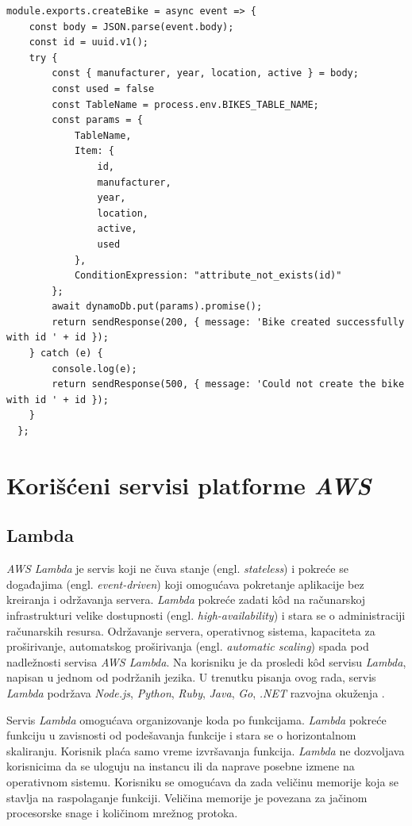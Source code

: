 \documentclass[12pt,oneside]{memoir}
\begin{document}
\begin{lstlisting}[caption={Primer implementacije funkcije za kreiranje bicikala},captionpos=t]
  module.exports.createBike = async event => {
    const body = JSON.parse(event.body);
    const id = uuid.v1();
    try {
        const { manufacturer, year, location, active } = body;
        const used = false
        const TableName = process.env.BIKES_TABLE_NAME;
        const params = {
            TableName,
            Item: {
                id,
                manufacturer,
                year,
                location,
                active,
                used
            },
            ConditionExpression: "attribute_not_exists(id)"
        };
        await dynamoDb.put(params).promise();
        return sendResponse(200, { message: 'Bike created successfully with id ' + id });
    } catch (e) {
        console.log(e);
        return sendResponse(500, { message: 'Could not create the bike with id ' + id });
    }
  };
  \end{lstlisting}
  
\section{Korišćeni servisi platforme \emph{AWS}}
\subsection{Lambda}
   
\emph{AWS Lambda} je servis koji ne čuva stanje (engl. \emph{stateless}) i pokreće se događajima (engl. \emph{event-driven}) koji omogućava pokretanje aplikacije bez kreiranja i održavanja servera. \emph{Lambda} pokreće zadati kôd na računarskoj infrastrukturi velike dostupnosti (engl. \emph{high-availability}) i stara se o administraciji računarskih resursa. Održavanje servera, operativnog sistema, kapaciteta za proširivanje, automatskog proširivanja (engl. \emph{automatic scaling}) spada pod nadležnosti servisa \emph{AWS Lambda}. Na korisniku je da prosledi kôd servisu \emph{Lambda}, napisan u jednom od podržanih jezika. U trenutku pisanja ovog rada, servis \emph{Lambda} podržava \emph{Node.js}, \emph{Python}, \emph{Ruby}, \emph{Java}, \emph{Go}, \emph{.NET} razvojna okuženja \cite{lr}.

Servis \emph{Lambda} omogućava organizovanje koda po funkcijama. \emph{Lambda} pokreće funkciju u zavisnosti od podešavanja funkcije i stara se o horizontalnom skaliranju. Korisnik plaća samo vreme izvršavanja funkcija. \emph{Lambda} ne dozvoljava korisnicima da se uloguju na instancu ili da naprave posebne izmene na operativnom sistemu. Korisniku se omogućava da zada veličinu memorije koja se stavlja na raspolaganje funkciji. Veličina memorije je povezana za jačinom procesorske snage i količinom mrežnog protoka.
  
\end{document}
